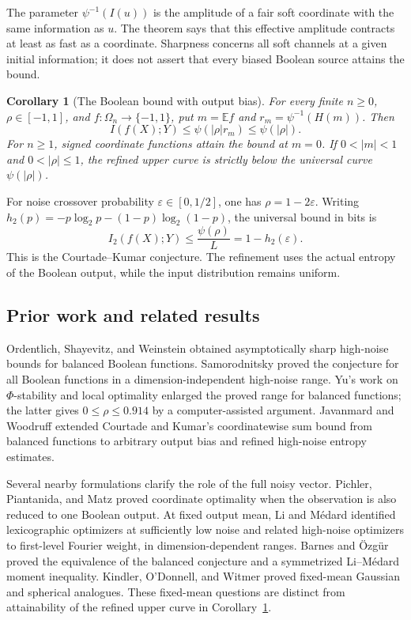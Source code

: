 \documentclass[11pt]{article}
\newtheorem{corollary}[theorem]{Corollary}
\theoremstyle{definition}
\theoremstyle{remark}
\newcommand{\E}{\mathbb E}
\numberwithin{equation}{section}
\begin{document}
The parameter $\psi^{-1}(I(u))$ is the amplitude of a fair soft
coordinate with the same information as $u$.  The theorem says that
this effective amplitude contracts at least as fast as a coordinate.
Sharpness concerns all soft channels at a given initial information;
it does not assert that every biased Boolean source attains the bound.

\begin{corollary}[The Boolean bound with output bias]
\label{main:ck}
For every finite $n\ge0$, $\rho\in[-1,1]$, and
$f:\Omega_n\to\{-1,1\}$, put
$m=\E f$ and $r_m=\psi^{-1}(H(m))$.  Then
\begin{equation}
 I(f(X);Y)\le\psi(|\rho|r_m)\le\psi(|\rho|).
 \label{main:bound}
\end{equation}
For $n\ge1$, signed coordinate functions attain the bound at $m=0$.
If $0<|m|<1$ and $0<|\rho|\le1$, the refined upper curve is
strictly below the universal curve $\psi(|\rho|)$.
\end{corollary}

For noise crossover probability $\varepsilon\in[0,1/2]$, one has
$\rho=1-2\varepsilon$. Writing
$h_2(p)=-p\log_2p-(1-p)\log_2(1-p)$, the universal bound in bits is
\[
 I_2(f(X);Y)\le\frac{\psi(\rho)}{L}=1-h_2(\varepsilon).
\]
This is the Courtade--Kumar conjecture. The refinement uses the actual
entropy of the Boolean output, while the input distribution remains uniform.

\subsection{Prior work and related results}

Ordentlich, Shayevitz, and Weinstein
\cite{OrdentlichShayevitzWeinstein2016} obtained asymptotically sharp
high-noise bounds for balanced Boolean functions. Samorodnitsky
\cite{Samorodnitsky2016} proved the conjecture for all
Boolean functions in a dimension-independent high-noise range.
Yu's work on $\Phi$-stability and local optimality
\cite{Yu2023,Yu2026} enlarged the proved range for balanced functions;
the latter gives $0\le\rho\le0.914$ by a computer-assisted argument.
Javanmard and Woodruff \cite{JavanmardWoodruff2026} extended
Courtade and Kumar's coordinatewise sum bound
\cite[Theorem~1]{CourtadeKumar2014} from balanced functions to
arbitrary output bias and refined high-noise entropy estimates.

Several nearby formulations clarify the role of the full noisy vector.
Pichler, Piantanida, and Matz \cite{PichlerPiantanidaMatz2018} proved
coordinate optimality when the observation is also reduced to one
Boolean output. At fixed output mean, Li and M\'edard
\cite{LiMedard2021} identified lexicographic optimizers at sufficiently
low noise and related high-noise optimizers to first-level Fourier
weight, in dimension-dependent ranges. Barnes and \"Ozg\"ur
\cite{BarnesOzgur2020} proved the equivalence of the balanced conjecture
and a symmetrized Li--M\'edard moment inequality.
Kindler, O'Donnell, and Witmer \cite{KindlerODonnellWitmer2016}
proved fixed-mean Gaussian and spherical analogues. These fixed-mean
questions are distinct from attainability of the refined upper curve
in Corollary~\ref{main:ck}.
\end{document}
